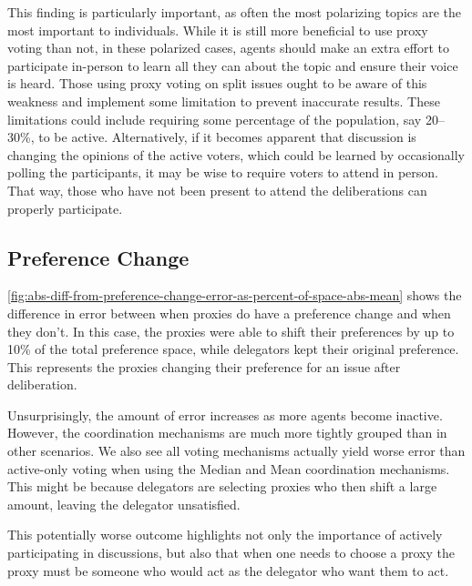 This finding is particularly important, as often the most polarizing topics are the
most important to individuals.
While it is still more beneficial to use proxy voting than not, in these polarized
cases, agents should make an extra effort to participate in-person to learn all they
can about the topic and ensure their voice is heard.
Those using proxy voting on split issues ought to be aware of this weakness and
implement some limitation to prevent inaccurate results.
These limitations could include requiring some percentage of the population, say
20--30\%, to be active.
Alternatively, if it becomes apparent that discussion is changing the opinions of the
active voters, which could be learned by occasionally polling the participants, it
may be wise to require voters to attend in person.
That way, those who have not been present to attend the deliberations can properly
participate.

\subsection{Preference Change}\label{subsec:results-shift}
\autoref{fig:abs-diff-from-preference-change-error-as-percent-of-space-abs-mean} shows
the difference in error between when proxies do have a preference change and when
they don't.
In this case, the proxies were able to shift their preferences by up to 10\% of the
total preference space, while delegators kept their original preference.
This represents the proxies changing their preference for an issue after deliberation.

Unsurprisingly, the amount of error increases as more agents become inactive.
However, the coordination mechanisms are much more tightly grouped than in other
scenarios.
We also see all voting mechanisms actually yield worse error than active-only
voting when using the Median and Mean coordination mechanisms.
This might be because delegators are selecting proxies who then shift a large amount,
leaving the delegator unsatisfied.

This potentially worse outcome highlights not only the importance of actively
participating in discussions, but also that when one needs to choose a proxy the
proxy must be someone who would act as the delegator who want them to act.

